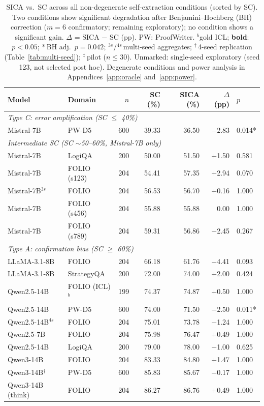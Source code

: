 \begin{table}[t]
\centering
\small
\caption{SICA vs.\ SC across all non-degenerate self-extraction conditions (sorted by SC). Two conditions show significant degradation after Benjamini--Hochberg (BH) correction ($m{=}6$ confirmatory; remaining exploratory); no condition shows a significant gain. $\Delta$ = SICA $-$ SC (pp). PW: ProofWriter. $^b$gold ICL; \textbf{bold}: $p < 0.05$; {*}\,BH adj.\ $p = 0.042$; $^{3s}$/$^{4s}$\,multi-seed aggregates; $^\dagger$\,4-seed replication (Table~\ref{tab:multi-seed}); $^\ddagger$\,pilot ($n{\leq}30$). Unmarked: single-seed exploratory (seed 123, not selected post hoc). Degenerate conditions and power analysis in Appendices~\ref{app:oracle} and~\ref{app:power}.}
\label{tab:main_results}
\begin{tabular}{@{}llrrrrl@{}}
\toprule
Model & Domain & $n$ & SC (\%) & SICA (\%) & $\Delta$ (pp) & $p$ \\
\midrule
\multicolumn{7}{l}{\textit{Type C: error amplification (SC $\leq$ 40\%)}} \\
Mistral-7B & PW-D5 & 600 & 39.33 & 36.50 & $\mathbf{-2.83}$ & 0.014{*} \\
\midrule
\multicolumn{7}{l}{\textit{Intermediate SC (SC $\sim$50--60\%, Mistral-7B only)}} \\
Mistral-7B & LogiQA & 200 & 50.00 & 51.50 & $+$1.50 & 0.581 \\
Mistral-7B & FOLIO (s123) & 204 & 54.41 & 57.35 & $+$2.94 & 0.070 \\
Mistral-7B$^{3s}$ & FOLIO & 204 & 56.53 & 56.70 & $+$0.16 & 1.000 \\
Mistral-7B & FOLIO (s456) & 204 & 55.88 & 55.88 & 0.00 & 1.000 \\
Mistral-7B & FOLIO (s789) & 204 & 59.31 & 56.86 & $-$2.45 & 0.267 \\
\midrule
\multicolumn{7}{l}{\textit{Type A: confirmation bias (SC $\geq$ 60\%)}} \\
LLaMA-3.1-8B & FOLIO & 204 & 66.18 & 61.76 & $-$4.41 & 0.093 \\
LLaMA-3.1-8B & StrategyQA & 200 & 72.00 & 74.00 & $+$2.00 & 0.424 \\
\addlinespace
Qwen2.5-14B & FOLIO (ICL)$^b$ & 199 & 74.37 & 74.87 & $+$0.50 & 1.000 \\
Qwen2.5-14B & PW-D5 & 600 & 74.00 & 71.50 & $\mathbf{-2.50}$ & 0.011{*} \\
Qwen2.5-14B$^{4s}$ & FOLIO & 204 & 75.01 & 73.78 & $-$1.24 & 1.000 \\
Qwen2.5-7B & FOLIO & 204 & 75.98 & 76.47 & $+$0.49 & 1.000 \\
Qwen2.5-14B & LogiQA & 200 & 79.00 & 78.00 & $-$1.00 & 0.625 \\
\addlinespace
Qwen3-14B & FOLIO & 204 & 83.33 & 84.80 & $+$1.47 & 1.000 \\
Qwen3-14B$^\dagger$ & PW-D5 & 600 & 85.83 & 85.67 & $-$0.17 & 1.000 \\
Qwen3-14B (think) & FOLIO & 204 & 86.27 & 86.76 & $+$0.49 & 1.000 \\
\bottomrule
\end{tabular}
\end{table}

